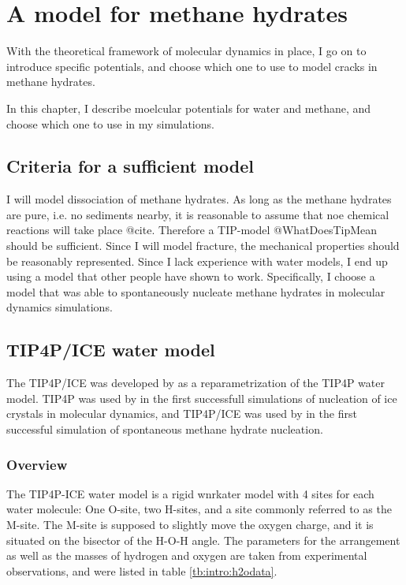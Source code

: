 \chapter{A model for methane hydrates}
\label{ch:models}
With the theoretical framework of molecular dynamics in place, I go on to introduce specific potentials, and choose which one to use to model cracks in methane hydrates. 

In this chapter, I describe moelcular potentials for water and methane, and choose which one to use in my simulations.  

\section{Criteria for a sufficient model}
I will model dissociation of methane hydrates. As long as the methane hydrates are pure, i.e. no sediments nearby, it is reasonable to assume that noe chemical reactions will take place @cite. Therefore a TIP-model @WhatDoesTipMean should be sufficient. Since I will model fracture, the mechanical properties should be reasonably represented. Since I lack experience with water models, I end up using a model that other people have shown to work. Specifically, I choose a model that was able to spontaneously nucleate methane hydrates in molecular dynamics simulations. 

\section{TIP4P/ICE water model}
The TIP4P/ICE was developed by \citet{Abascal2005} as a reparametrization of the TIP4P water model. TIP4P was used by \citet{Matsumoto2002} in the first successfull simulations of nucleation of ice crystals in molecular dynamics, and TIP4P/ICE was used by \citet{Walsh2009} in the first successful simulation of spontaneous methane hydrate nucleation. 

\subsection{Overview}
The TIP4P-ICE water model is a rigid wnrkater model with 4 sites for each water molecule: One O-site, two H-sites, and a site commonly referred to as the M-site. The M-site is supposed to slightly move the oxygen charge, and it is situated on the bisector of the H-O-H angle. The parameters for the arrangement as well as the masses of hydrogen and oxygen are taken from experimental observations, and were listed in table \ref{tb:intro:h2odata}.

